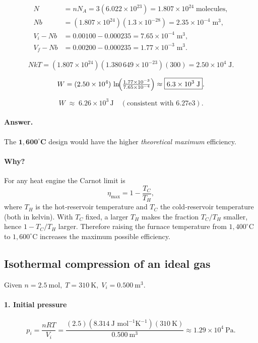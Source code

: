 \documentclass[12pt]{article}
\theoremstyle{definition} %
\theoremstyle{plain} %
\begin{document}
\[
  \begin{aligned}
    N &= nN_A = 3(6.022\times10^{23})
         = 1.807\times10^{24}\;\text{molecules},\\[4pt]
    Nb &= (1.807\times10^{24})(1.3\times10^{-28})
          = 2.35\times10^{-4}\;\text{m}^{3},\\[6pt]
    V_i-Nb &= 0.00100-0.000235 = 7.65\times10^{-4}\;\text{m}^{3},\\
    V_f-Nb &= 0.00200-0.000235 = 1.77\times10^{-3}\;\text{m}^{3}.
  \end{aligned}
\]

\[
  NkT = (1.807\times10^{24})(1.380\,649\times10^{-23})(300)
       = 2.50\times10^{4}\;\text{J}.
\]

\[
  W
  = (2.50\times10^{4})\,
    \ln\!\Bigl(\tfrac{1.77\times10^{-3}}{7.65\times10^{-4}}\Bigr)
  \approx \boxed{6.3\times10^{3}\;\text{J}}.
\]

\[
  W \;\approx\; 6.26 \times 10^{3}\,\text{J} \quad(\text{consistent with }6.27\text{e3}).
\]
\paragraph{Answer.}
The \(\mathbf{1{,}600^{\circ}\!\text{C}}\) design would have the higher
\emph{theoretical maximum} efficiency.

\paragraph{Why?}
For any heat engine the Carnot limit is
\[
  \eta_{\text{max}}
  = 1 - \frac{T_C}{T_H},
\]
where \(T_H\) is the hot‐reservoir temperature and \(T_C\) the cold‐reservoir
temperature (both in kelvin).  
With \(T_C\) fixed, a larger \(T_H\) makes the fraction
\(T_C/T_H\) smaller, hence \(1-T_C/T_H\) larger.  
Therefore raising the furnace temperature from \(1{,}400^{\circ}\text{C}\)
to \(1{,}600^{\circ}\text{C}\) increases the maximum possible efficiency.
\subsection*{Isothermal compression of an ideal gas}

Given  
\(n = 2.5\ \text{mol},\;
 T = 310\ \text{K},\;
 V_i = 0.500\ \text{m}^3\).

\paragraph{1. Initial pressure}
\[
  p_i = \frac{nRT}{V_i}
       = \frac{(2.5)(8.314\ \text{J mol}^{-1}\text{K}^{-1})(310\ \text{K})}
              {0.500\ \text{m}^{3}}
       \approx \boxed{1.29\times10^{4}\ \text{Pa}}.
\]
\end{document}
